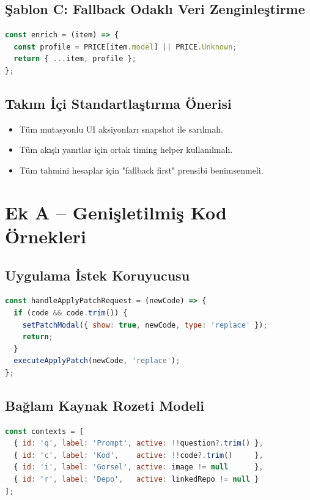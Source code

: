 \documentclass[12pt,a4paper]{article}
\begin{document}
\subsection{Şablon C: Fallback Odaklı Veri Zenginleştirme}
\begin{lstlisting}[language=JavaScript]
const enrich = (item) => {
  const profile = PRICE[item.model] || PRICE.Unknown;
  return { ...item, profile };
};
\end{lstlisting}

\subsection{Takım İçi Standartlaştırma Önerisi}
\begin{itemize}[leftmargin=*]
  \item Tüm mutasyonlu UI aksiyonları snapshot ile sarılmalı.
  \item Tüm akışlı yanıtlar için ortak timing helper kullanılmalı.
  \item Tüm tahmini hesaplar için "fallback first" prensibi benimsenmeli.
\end{itemize}

\section{Ek A -- Genişletilmiş Kod Örnekleri}

\subsection{Uygulama İstek Koruyucusu}
\begin{lstlisting}[language=JavaScript]
const handleApplyPatchRequest = (newCode) => {
  if (code && code.trim()) {
    setPatchModal({ show: true, newCode, type: 'replace' });
    return;
  }
  executeApplyPatch(newCode, 'replace');
};
\end{lstlisting}

\subsection{Bağlam Kaynak Rozeti Modeli}
\begin{lstlisting}[language=JavaScript]
const contexts = [
  { id: 'q', label: 'Prompt', active: !!question?.trim() },
  { id: 'c', label: 'Kod',    active: !!code?.trim()     },
  { id: 'i', label: 'Gorsel', active: image != null      },
  { id: 'r', label: 'Depo',   active: linkedRepo != null }
];
\end{lstlisting}
\end{document}
